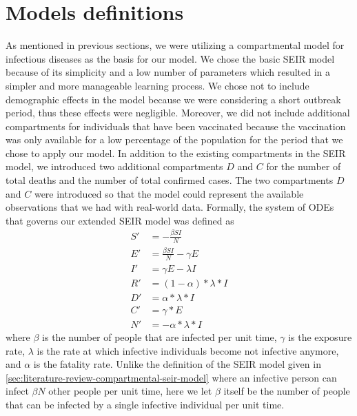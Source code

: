 \section{Models definitions}
\label{sec:methodologies-models-definitions}

As mentioned in previous sections, we were utilizing a compartmental model for infectious diseases as the basis for our model.
We chose the basic \gls{SEIR} model because of its simplicity and a low number of parameters which resulted in a simpler and more manageable learning process.
We chose not to include demographic effects in the model because we were considering a short outbreak period, thus these effects were negligible.
Moreover, we did not include additional compartments for individuals that have been vaccinated because the vaccination was only available for a low percentage of the population for the period that we chose to apply our model.
In addition to the existing compartments in the \gls{SEIR} model, we introduced two additional compartments $D$ and $C$ for the number of total deaths and the number of total confirmed cases.
The two compartments $D$ and $C$ were introduced so that the model could represent the available observations that we had with real-world data.
Formally, the system of \glspl{ODE} that governs our extended \gls{SEIR} model was defined as
\begin{equation}
    \begin{aligned}
        S' &= - \frac{\beta SI}{N} \\
        E' &= \frac{\beta SI}{N} - \gamma E \\
        I' &= \gamma E - \lambda I \\
        R' &= (1 - \alpha) * \lambda * I \\
        D' &= \alpha * \lambda * I \\
        C' &= \gamma * E \\
        N' &= - \alpha * \lambda * I
    \end{aligned}
    \label{eq:methodologies-seir-model}
\end{equation}
where $\beta$ is the number of people that are infected per unit time, $\gamma$ is the exposure rate, $\lambda$ is the rate at which infective individuals become not infective anymore, and $\alpha$ is the fatality rate.
Unlike the definition of the \gls{SEIR} model given in \autoref{sec:literature-review-compartmental-seir-model} where an infective person can infect $\beta N$ other people per unit time, here we let $\beta$ itself be the number of people that can be infected by a single infective individual per unit time.
